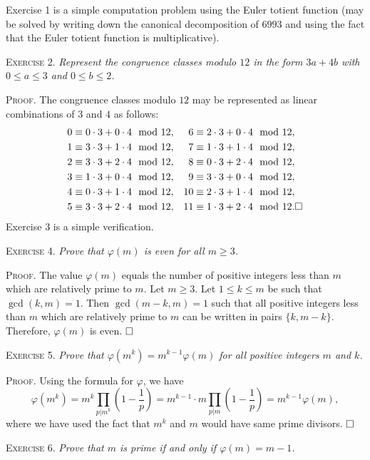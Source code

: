 \documentclass[11pt, leqno]{article}
\newcommand{\done}{\ensuremath{\hfill\square}}
\begin{document}
Exercise 1 is a simple computation problem using the Euler totient function (may be solved by writing down the canonical decomposition of $6993$ and using the fact that the Euler totient function is multiplicative).

\textsc{Exercise 2}. \emph{Represent the congruence classes modulo $12$ in the form $3a+4b$ with $0\leq a \leq 3$ and $0\leq b \leq 2$.}

\textsc{Proof}. The congruence classes modulo $12$ may be represented as linear combinations of $3$ and $4$ as follows: 
\begin{align*}
  0 & \equiv 0\cdot 3 + 0\cdot 4 \mod 12, & 6 & \equiv 2\cdot 3 + 0\cdot 4 \mod 12,\\
  1 & \equiv 3\cdot 3 + 1\cdot 4 \mod 12, & 7 & \equiv 1\cdot 3 + 1\cdot 4 \mod 12,\\
  2 & \equiv 3\cdot 3 + 2\cdot 4 \mod 12, & 8 & \equiv 0\cdot 3 + 2\cdot 4 \mod 12,\\
  3 & \equiv 1\cdot 3 + 0\cdot 4 \mod 12, & 9 & \equiv 3\cdot 3 + 0\cdot 4 \mod 12,\\
  4 & \equiv 0\cdot 3 + 1\cdot 4 \mod 12, & 10 & \equiv 2\cdot 3 + 1\cdot 4 \mod 12,\\
  5 & \equiv 3\cdot 3 + 2\cdot 4 \mod 12, & 11 & \equiv 1\cdot 3 + 2\cdot 4 \mod 12. \done
\end{align*}
Exercise 3 is a simple verification.

\textsc{Exercise 4}. \emph{Prove that $\varphi(m)$ is even for all $m\geq 3$.}

\textsc{Proof}. The value $\varphi(m)$ equals the number of positive integers less than $m$ which are relatively prime to $m$. Let $m\geq 3$. Let $1\leq k \leq m$ be such that $\gcd(k, m) = 1$. Then $\gcd(m-k, m) = 1$ such that all positive integers less than $m$ which are relatively prime to $m$ can be written in pairs $\{k, m-k\}$. Therefore, $\varphi(m)$ is even. \done

\textsc{Exercise 5}. \emph{Prove that $\varphi(m^k) = m^{k-1}\varphi(m)$ for all positive integers $m$ and $k$.}

\textsc{Proof}. Using the formula for $\varphi$, we have
\begin{displaymath}
\varphi(m^k) = m^k \prod_{p|m^k} \left(1-\frac{1}{p}\right) = m^{k-1}\cdot m \prod_{p|m}\left(1-\frac{1}{p}\right) = m^{k-1}\varphi(m),
\end{displaymath}
where we have used the fact that $m^k$ and $m$ would have same prime divisors. \done

\textsc{Exercise 6}. \emph{Prove that $m$ is prime if and only if $\varphi(m) = m-1$.}
\end{document}

